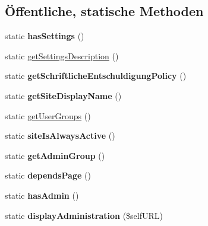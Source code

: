 \subsection*{Öffentliche, statische Methoden}
\begin{DoxyCompactItemize}
\item 
\mbox{\label{classabsenzensekretariat_a37054ec59a395f039d04cc5c37fe5850}} 
static {\bfseries has\+Settings} ()
\item 
static \mbox{\hyperlink{classabsenzensekretariat_a817c3ee9f0393a06973a6c8fe5f01a01}{get\+Settings\+Description}} ()
\item 
\mbox{\label{classabsenzensekretariat_afc8b2b27632f12a9a6cbfc2bf78da659}} 
static {\bfseries get\+Schriftliche\+Entschuldigung\+Policy} ()
\item 
\mbox{\label{classabsenzensekretariat_ace5b0a4390389c540b5cb47f3d364981}} 
static {\bfseries get\+Site\+Display\+Name} ()
\item 
static \mbox{\hyperlink{classabsenzensekretariat_a780e602fcc6f2c4dfdfca1cfd5556860}{get\+User\+Groups}} ()
\item 
\mbox{\label{classabsenzensekretariat_a0bf0de553c0d959f2f0ad870ffcace98}} 
static {\bfseries site\+Is\+Always\+Active} ()
\item 
\mbox{\label{classabsenzensekretariat_a626cc0708cbe15b95c859d88a5b981e2}} 
static {\bfseries get\+Admin\+Group} ()
\item 
\mbox{\label{classabsenzensekretariat_a98b526632836e6aa00f78311ccfc8dad}} 
static {\bfseries depends\+Page} ()
\item 
\mbox{\label{classabsenzensekretariat_a16770252c081723812b88bc96c818342}} 
static {\bfseries has\+Admin} ()
\item 
\mbox{\label{classabsenzensekretariat_aaa10d00d086311363aceffb7d091591e}} 
static {\bfseries display\+Administration} (\$self\+U\+RL)
\item 
\mbox{\label{classabsenzensekretariat_a0dec6d505fa3a3e7afbfeed54d35bc20}} 

\end{DoxyCompactItemize}
